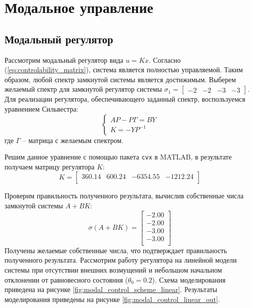 \section{Модальное управление}
\subsection{Модальный регулятор}
Рассмотрим модальный регулятор вида $u = Kx$. Согласно (\ref{eq:controlability_matrix}), система является 
полностью управляемой. Таким образом, любой спектр замкнутой системы является достижимым. 
Выберем желаемый спектр для замкнутой регулятор системы $\sigma_1 = \begin{bmatrix}-2 & -2 & -3 & -3\end{bmatrix}$. 
Для реализации регулятора, обеспечивающего заданный спектр, воспользуемся уравнением Сильвестра: 
\begin{equation}
    \begin{cases}
        AP - P\Gamma = BY \\
        K = -YP^{-1} 
    \end{cases}
\end{equation}
где $\Gamma$ -- матрица с желаемым спектром. 

Решим данное уравнение с помощью пакета \texttt{cvx} в MATLAB, в результате получаем матрицу регулятора $K$:
\begin{equation}
    K = \begin{bmatrix}
    360.14  & 600.24  & -6354.55  & -1212.24 \\ 
    \end{bmatrix}
\end{equation} 

Проверим правильность полученного результата, вычислив собственные числа замкнутой системы $A + BK$: 
\begin{equation}
    \sigma(A + BK) = \begin{bmatrix}
    -2.00 \\ 
    -2.00 \\ 
    -3.00 \\ 
    -3.00 \\ 
    \end{bmatrix}
\end{equation}
Получены желаемые собственные числа, что подтверждает правильность полученного результата. 
Рассмотрим работу регулятора на линейной модели системы при отсутствии внешних возмущений и 
небольшом начальном отклонении от равновесного состояния ($\theta_0 = 0.2$). Схема моделирования приведена на 
рисунке \ref{fig:modal_control_scheme_linear}. Результаты моделирования приведены на 
рисунке \ref{fig:modal_control_linear_out}.


